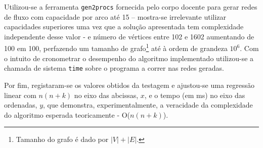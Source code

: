 \documentclass[12pt]{article}
\begin{document}
Utilizou-se a ferramenta \texttt{gen2procs} fornecida pelo corpo docente para gerar redes de fluxo com capacidade por arco até 15 – mostra-se irrelevante utilizar capacidades superiores uma vez que a solução apresentada tem complexidade independente desse valor - e número de vértices entre 102 e 1602 aumentando de 100 em 100, perfazendo um tamanho de grafo\footnote{Tamanho do grafo é dado por \href{https://bit.ly/3gfDEJJ}{$\left|V\right|+\left|E\right|$}.} até à ordem de grandeza $10^6$. Com o intuito de cronometrar o desempenho do algoritmo implementado utilizou-se a chamada de sistema \texttt{time} sobre o programa a correr nas redes geradas.
\begin{center}
\end{center}

Por fim, registaram-se os valores obtidos da testagem e ajustou-se uma regressão linear com $n(n + k)$ no eixo das abcissas, $x$, e o tempo (em ms) no eixo das ordenadas, $y$, que demonstra, experimentalmente, a veracidade da complexidade do algoritmo esperada teoricamente - O($n(n + k)$).
\end{document}

